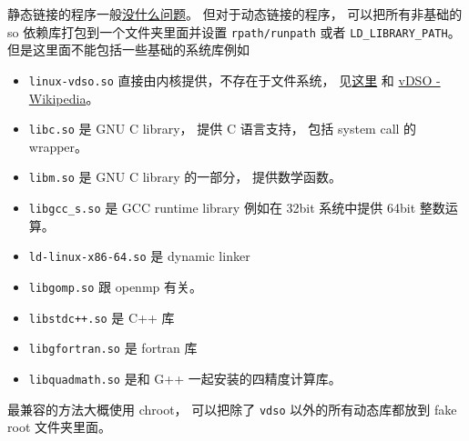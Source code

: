 静态链接的程序一般\href{https://stackoverflow.com/questions/31801824/is-static-linking-in-linux-portable}{没什么问题}。 但对于动态链接的程序， 可以把所有非基础的 so 依赖库打包到一个文件夹里面并设置 \verb|rpath/runpath| 或者 \verb|LD_LIBRARY_PATH|。 但是这里面不能包括一些基础的系统库例如
\begin{itemize}
\item \verb`linux-vdso.so` 直接由内核提供，不存在于文件系统， 见\href{https://unix.stackexchange.com/questions/476971/ldd-shows-no-location-after-arrow-library-does-not-exist-on-system}{这里} 和 \href{https://en.wikipedia.org/wiki/VDSO}{vDSO - Wikipedia}。
\item \verb`libc.so` 是 GNU C library， 提供 C 语言支持， 包括 system call 的 wrapper。
\item \verb`libm.so` 是 GNU C library 的一部分， 提供数学函数。
\item \verb`libgcc_s.so` 是 GCC runtime library 例如在 32bit 系统中提供 64bit 整数运算。
\item \verb`ld-linux-x86-64.so` 是 dynamic linker
\item \verb`libgomp.so` 跟 openmp 有关。
\item \verb`libstdc++.so` 是 C++ 库
\item \verb`libgfortran.so` 是 fortran 库
\item \verb`libquadmath.so` 是和 G++ 一起安装的四精度计算库。
\end{itemize}

最兼容的方法大概使用 chroot， 可以把除了 \verb|vdso| 以外的所有动态库都放到 fake root 文件夹里面。
